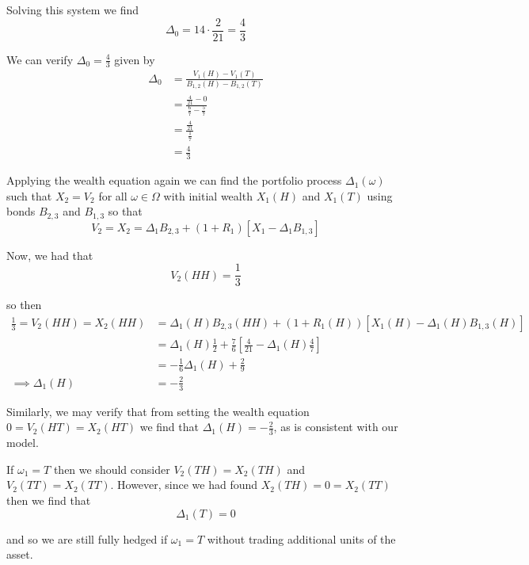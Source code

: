 \documentclass[12pt]{article}
\newlength\tindent
\renewcommand{\indent}{\hspace*{\tindent}}
\begin{document}
Solving this system we find 
\begin{equation*}
	\Delta_0 = 14 \cdot \frac{2}{21} = \frac{4}{3}
\end{equation*}

We can verify $\Delta_0 = \frac{4}{3}$ given by
\begin{align*}
	\Delta_0 &= \frac{ V_1(H) - V_1(T) }{ B_{1,2}(H) - B_{1,2}(T) } \\
	&= \frac{ \frac{4}{21} - 0 }{ \frac{6}{7} - \frac{5}{7} } \\
	&= \frac{ \frac{4}{21} }{ \frac{1}{7} } \\
	&= \frac{4}{3}
\end{align*}

Applying the wealth equation again we can find the portfolio process $\Delta_1(\omega)$ such that $X_2 = V_2$ for all $\omega \in \Omega$ with initial wealth $X_1(H)$ and $X_1(T)$ using bonds $B_{2,3}$ and $B_{1,3}$ so that
\begin{equation*}
	V_2 = X_2 = \Delta_1B_{2,3} + (1 + R_1)[X_1 - \Delta_1B_{1,3}]
\end{equation*}

Now, we had that
\begin{equation*}
	V_2(HH) = \frac{1}{3}
\end{equation*}

so then
\begin{align*}
	\frac{1}{3} = V_2(HH) = X_2(HH) &= \Delta_1(H)B_{2,3}(HH) + (1 + R_1(H))[X_1(H) - \Delta_1(H)B_{1,3}(H)] \\
	&= \Delta_1(H)\frac{1}{2} + \frac{7}{6}\left[ \frac{4}{21} - \Delta_1(H)\frac{4}{7}\right] \\
	&= -\frac{1}{6}\Delta_1(H) + \frac{2}{9} \\
	\implies \Delta_1(H) &= -\frac{2}{3}
\end{align*}

\indent Similarly, we may verify that from setting the wealth equation $0 = V_2(HT) = X_2(HT)$ we find that $\Delta_1(H) = -\frac{2}{3}$, as is consistent with our model.

\indent If $\omega_1 = T$ then we should consider $V_2(TH) = X_2(TH)$ and $V_2(TT) = X_2(TT)$. However, since we had found $X_2(TH) = 0 = X_2(TT)$ then we find that
\begin{equation*}
	\Delta_1(T) = 0
\end{equation*}

and so we are still fully hedged if $\omega_1 = T$ without trading additional units of the asset.
\end{document}
